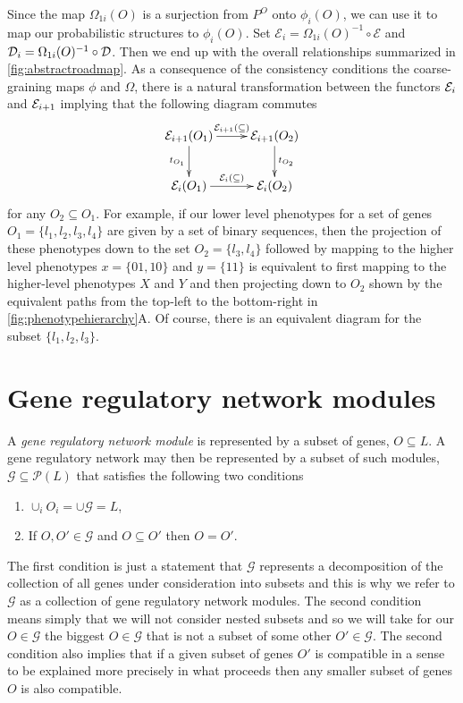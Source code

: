 Since the map $\Omega_{1i}(O)$ is a surjection from $P^O$ onto $\phi_i(O)$, we can use it to map our probabilistic structures to $\phi_i(O)$.  Set $\mathcal{E}_i = \Omega_{1i}(O)^{-1} \circ \mathcal{E}$ and $\mathcal{D}_i = \Omega_{1i}(O)^{-1} \circ \mathcal{D}$.  Then we end up with the overall relationships summarized in \ref{fig:abstractroadmap}. As a consequence of the consistency conditions the coarse-graining maps $\phi$ and $\Omega$, there is a natural transformation between the functors $\mathcal{E}_i$ and $\mathcal{E}_{i+1}$ implying that the following diagram commutes
$$
\xymatrix{
\expr_{i+1}(O_1) \ar[r]^{\expr_{i+1}(\subseteq)} \ar[d]_{t_{O_1}} & \expr_{i+1}(O_2) \ar[d]^{t_{O_2}} \\
\expr_{i}(O_1) \ar[r]^{\expr_{i}(\subseteq)} & \expr_{i}(O_2) }
$$
for any $O_2 \subseteq O_1$. For example, if our lower level phenotypes for a set of genes $O_1 = \{ l_1,l_2,l_3,l_4 \}$ are given by a set of binary sequences, then the projection of these phenotypes down to the set $O_2 = \{l_3,l_4\}$ followed by mapping to the higher level phenotypes $x=\{01,10\}$ and $y=\{11\}$ is equivalent to first mapping to the higher-level phenotypes $X$ and $Y$ and then projecting down to $O_2$ shown by the equivalent paths from the top-left to the bottom-right in \ref{fig:phenotypehierarchy}A.
Of course, there is an equivalent diagram for the subset $\{ l_1,l_2,l_3 \}$.
\section{Gene regulatory network modules}\label{sec:covergenotypespace}
A \emph{gene regulatory network module} is represented by a subset of genes, $O \subseteq L$. A gene regulatory network may then be represented by a subset of such modules, $\mathcal{G} \subseteq \mathcal{P}(L)$ that satisfies the following two conditions
\begin{enumerate}
\item $\cup_i O_i = \cup \mathcal{G} = L$,
\item If $O,O' \in \mathcal{G}$ and $O \subseteq O'$ then $O = O'$.
\end{enumerate}
The first condition is just a statement that $\mathcal{G}$ represents a decomposition of the collection of all genes under consideration into subsets and this is why we refer to $\mathcal{G}$ as a collection of gene regulatory network modules. The second condition means simply that we will not consider nested subsets and so we will take for our $O \in \mathcal{G}$ the biggest $O \in \mathcal{G}$ that is not a subset of some other $O' \in \mathcal{G}$. The second condition also implies that if a given subset of genes $O'$ is compatible in a sense to be explained more precisely in what proceeds then any smaller subset of genes $O$ is also compatible.


